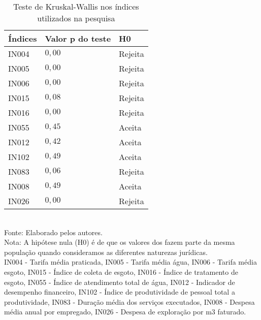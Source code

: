
\begin{table}[H] \centering 

\begin{minipage}{0.75\textwidth}
  \caption{Teste de Kruskal-Wallis nos índices utilizados na pesquisa} 
  \label{tab:krusk} 

\begin{tabular}{P{3.8cm}P{3.8cm}P{3.8cm}}
\toprule
\toprule
Índices & Valor p  do teste & H0 \\ 

\midrule

IN004 & $0,00$ & Rejeita \\ 
IN005 & $0,00$ & Rejeita \\ 
IN006 & $0,00$ & Rejeita \\ 
\hline
IN015 & $0,08$ & Rejeita \\ 
IN016 & $0,00$ & Rejeita \\ 
IN055 & $0,45$ & Aceita \\ 
\hline
IN012 & $0,42$ & Aceita \\ 
IN102 & $0,49$ & Aceita \\ 
IN083 & $0,06$ & Rejeita \\ 
\hline
IN008 & $0,49$ & Aceita \\ 
IN026 & $0,00$ & Rejeita \\ 

\bottomrule

\end{tabular} 
	\footnotesize \\
		Fonte: Elaborado pelos autores. \\ 
		Nota: A hipótese nula (H0) é de que os valores dos fazem parte da mesma população quando consideramos as diferentes naturezas jurídicas. \\
				IN004 - Tarifa média praticada,
				IN005 - Tarifa média água,
				IN006 - Tarifa média esgoto,		
				IN015 - Índice de coleta de esgoto,
				IN016 - Índice de tratamento de esgoto,
				IN055 - Índice de atendimento total de água,	
				IN012 - Indicador de desempenho financeiro,
				IN102 - Índice de produtividade de pessoal total a produtividade,
				IN083 - Duração média dos serviços executados,	
				IN008 - Despesa média anual por empregado,
				IN026 - Despesa de exploração por m3 faturado.   	
\end{minipage}
\end{table} 